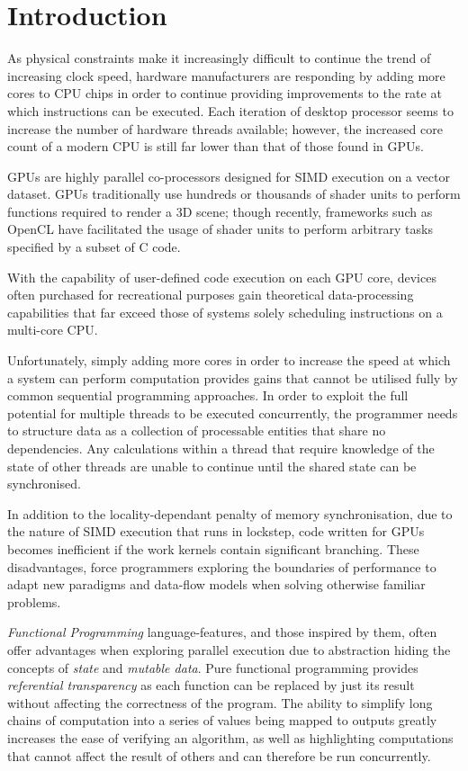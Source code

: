 \section{Introduction}
  As physical constraints make it increasingly difficult to continue the trend of increasing clock speed, hardware manufacturers are responding by adding more cores to \ac{CPU} chips in order to continue providing improvements to the rate at which instructions can be executed. \cite{perf}
  Each iteration of desktop processor seems to increase the number of hardware threads available; however, the increased core count of a modern \ac{CPU} is still far lower than that of those found in \ac{GPUs}.

\ac{GPUs} are highly parallel co-processors designed for \ac{SIMD} execution on a vector dataset.
\ac{GPUs} traditionally use hundreds or thousands of shader units to perform functions required to render a 3D scene; though recently, frameworks such as \ac{OpenCL} have facilitated the usage of shader units to perform arbitrary tasks specified by a subset of C code.

 With the capability of user-defined code execution on each GPU core, devices often purchased for recreational purposes gain theoretical data-processing capabilities that far exceed those of systems solely scheduling instructions on a multi-core \ac{CPU}. \cite{mars}

Unfortunately, simply adding more cores in order to increase the speed at which a system can perform computation provides gains that cannot be utilised fully by common sequential programming approaches.
In order to exploit the full potential for multiple threads to be executed concurrently, the programmer needs to structure data as a collection of processable entities that share no dependencies.
Any calculations within a thread that require knowledge of the state of other threads are unable to continue until the shared state can be synchronised.

In addition to the locality-dependant penalty of memory synchronisation, due to the nature of \ac{SIMD} execution that runs in lockstep, code written for \ac{GPUs} becomes inefficient if the work kernels contain significant branching. \cite{branching}
These disadvantages, force programmers exploring the boundaries of performance to adapt new paradigms and data-flow models when solving otherwise familiar problems.

\emph{Functional Programming} language-features, and those inspired by them, often offer advantages when exploring parallel execution \cite{parallelfunction} due to abstraction hiding the concepts of \emph{state} and \emph{mutable data}.
Pure functional programming provides \emph{referential transparency} as each function can be replaced by just its result without affecting the correctness of the program.
The ability to simplify long chains of computation into a series of values being mapped to outputs greatly increases the ease of verifying an algorithm, as well as highlighting computations that cannot affect the result of others and can therefore be run concurrently.

